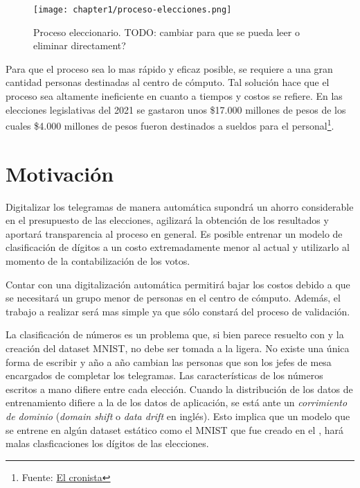 \begin{figure}[H]
    \centering
    \texttt{[image: chapter1/proceso-elecciones.png]}
    \caption{Proceso eleccionario. TODO: cambiar para que se pueda leer o eliminar directament?}
    \label{fig:proceso-elecciones}
\end{figure}

Para que el proceso sea lo mas rápido y eficaz posible, se requiere a una gran cantidad personas destinadas al centro
de cómputo. Tal solución hace que el proceso sea altamente ineficiente en cuanto a tiempos y costos se refiere. En las
elecciones legislativas del 2021 se gastaron unos \$17.000 millones de pesos de los cuales \$4.000 millones de pesos
fueron destinados a sueldos para el personal\footnote{Fuente:
    \href{https://www.cronista.com/economia-politica/Elecciones-legislativas-2021-cuanto-mas-se-gastara-por-el-coronavirus-segun-el-Presupuesto-20201004-0006.html}{El
        cronista}}.

\section{Motivación}

Digitalizar los telegramas de manera automática supondrá un ahorro considerable en el presupuesto de las elecciones,
agilizará la obtención de los resultados y aportará transparencia al proceso en general. Es posible entrenar un modelo
de clasificación de dígitos a un costo extremadamente menor al actual y utilizarlo al momento de la contabilización de
los votos.

Contar con una digitalización automática permitirá bajar los costos debido a que se necesitará un grupo menor de
personas en el centro de cómputo. Además, el trabajo a realizar será mas simple ya que sólo constará del proceso de
validación.

La clasificación de números es un problema que, si bien parece resuelto con \cite{lecun1998gradient} y la creación del
dataset MNIST, no debe ser tomada a la ligera. No existe una única forma de escribir y año a año cambian las personas
que son los jefes de mesa encargados de completar los telegramas. Las características de los números escritos a mano
difiere entre cada elección. Cuando la distribución de los datos de entrenamiento difiere a la de los datos de
aplicación, se está ante un {\it corrimiento de dominio} ({\it domain shift} o {\it data drift} en inglés). Esto
implica que un modelo que se entrene en algún dataset estático como el MNIST que fue creado en el
\citeyear{lecun1998gradient}, hará malas clasficaciones los dígitos de las elecciones.


